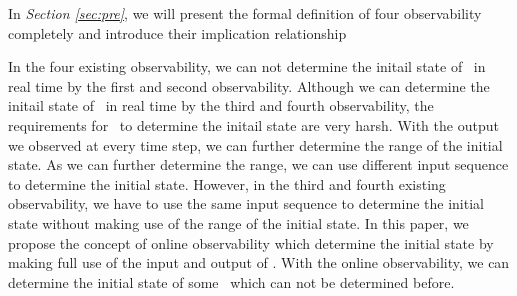 
In {\em Section \ref{sec:pre}}, we will present the formal definition of four observability completely and introduce their implication relationship%

In the four existing observability, we can not determine the initail state of \BCNs\ in real time by the first and second observability. Although we can determine the initail state of \BCNs\ in real time by the third and fourth observability, the requirements for \BCNs\ to determine the initail state are very harsh. With the output we observed at every time step, we can further determine the range of the initial state. As we can further determine the range, we can use different input sequence to determine the initial state. However, in the third and fourth existing observability, we have to use the same input sequence to determine the initial state without making use of the range of the initial state. In this paper, we propose the concept of online observability which determine the initial state by making full use of the input and output of \BCNs. With the online observability, we can determine the initial state of some \BCNs\ which can not be determined before.

